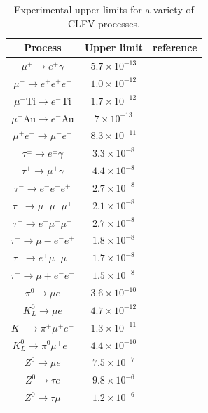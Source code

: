 \documentclass[12pt,a4paper,openright, oneside, titlepage]{book} %
\begin{document}
\begin{table}[!h]
\centering
\begin{tabular}{c|c|c}
\hline
Process & Upper limit & reference\\
\hline
\hline
$\mu^+\rightarrow e^+\gamma$ & $5.7\times 10^{-13}$ & \cite{MEG}\\
$\mu^+\rightarrow e^+e^+e^-$ & $1.0\times 10^{-12}$ & \cite{SINDRUM}\\
$\mu^-$Ti$\rightarrow e^-$Ti  & $1.7\times 10^{-12}$ & \cite{SINDRUM}\\
$\mu^-$Au$\rightarrow e^-$Au  & $7\times 10^{-13}$   & \cite{Bertl}\\
$\mu^+e^-\rightarrow \mu^-e^+$ & $8.3\times 10^{-11}$ & \cite{Willmann}\\
$\tau^\pm\rightarrow e^\pm\gamma$ & $3.3\times 10^{-8}$ & \cite{Aubert}\\
$\tau^\pm\rightarrow \mu^\pm\gamma$ & $4.4\times 10^{-8}$ & \cite{Aubert}\\
$\tau^-\rightarrow e^-e^-e^+$ & $2.7\times 10^{-8}$ & \cite{Hayasaka}\\
$\tau^-\rightarrow \mu^-\mu^-\mu^+$ & $2.1\times 10^{-8}$ & \cite{Hayasaka}\\
$\tau^-\rightarrow e^-\mu^-\mu^+$ & $2.7\times 10^{-8}$ & \cite{Hayasaka}\\
$\tau^-\rightarrow \mu-e^-e^+$ & $1.8\times 10^{-8}$ & \cite{Hayasaka}\\
$\tau^-\rightarrow e^+\mu^-\mu^-$ & $1.7\times 10^{-8}$ & \cite{Hayasaka}\\
$\tau^-\rightarrow \mu+e^-e^-$ & $1.5\times 10^{-8}$ & \cite{Hayasaka}\\
$\pi^0\rightarrow \mu e$ & $3.6\times 10^{-10}$ & \cite{Abouzaid}\\
$K^0_L\rightarrow \mu e$ & $4.7\times 10^{-12}$ & \cite{Ambrose}\\
$K^+\rightarrow \pi^+\mu^+e^-$ & $1.3\times 10^{-11}$ & \cite{Sher}\\
$K^0_L\rightarrow \pi^0\mu^+e^-$ & $4.4\times 10^{-10}$ & \cite{Abouzaid}\\
$Z^0\rightarrow \mu e$ & $7.5\times10^{-7}$& \cite{Aad}\\
$Z^0\rightarrow \tau e$ & $9.8\times10^{-6}$& \cite{Akers} \\
$Z^0\rightarrow \tau \mu$ & $1.2\times10^{-6}$& \cite{Akers}\\
\hline
\end{tabular}
\caption[Limits for CLFV processes]{Experimental upper limits for a variety of CLFV processes.}
\label{T_CLFV}
\end{table}
\end{document}
